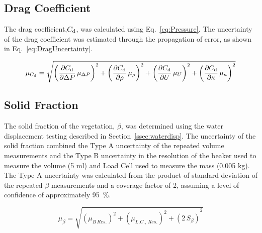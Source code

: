 \documentclass[12pt]{article}
\begin{document}
\subsection{Drag Coefficient}\label{ssec:DragUncertainty}
The drag coefficient,$C_{\rm d}$, was calculated using Eq.~\ref{eq:Pressure}.  The uncertainty of the drag coefficient was estimated through the propagation of error, as shown in Eq.~\ref{eq:DragUncertainty}.

\begin{equation}
\label{eq:DragUncertainty}
\mu_{C_{\rm d}} = \sqrt{{\left( \frac{\partial C_{\rm d}}{\partial \Delta P}\,\mu_{\Delta P} \right)}^2+{\left(\frac{\partial C_{\rm d}}{\partial \rho}\,\mu_{\rho}\right)}^2+{\left(\frac{\partial C_{\rm d}}{\partial U}\,\mu_{U}\right)}^2+{\left(\frac{\partial C_{\rm d}}{\partial \kappa}\,\mu_{\kappa}\right)}^2}
\end{equation}

\subsection{Solid Fraction}\label{ssec:SFUncertainty}
The solid fraction of the vegetation, $\beta$, was determined using the water displacement testing described in Section~\ref{ssec:waterdisp}. The uncertainty of the solid fraction combined the Type A uncertainty of the repeated volume measurements and the Type B uncertainty in the resolution of the beaker used to measure the volume (5 ml) and Load Cell used to measure the mass (0.005 kg). The Type A uncertainty was calculated from the product of standard deviation of the repeated $\beta$ measurements and a coverage factor of 2, assuming a level of confidence of approximately 95~\%.

\begin{equation}
\label{eq:betauncertainty}
\mu_{\beta} = \sqrt{{(\mu_{B\,Res.})^2+(\mu_{L.C.,\,Res.})^2+(2\,S_{\beta})}^2}
\end{equation} 
\end{document}
